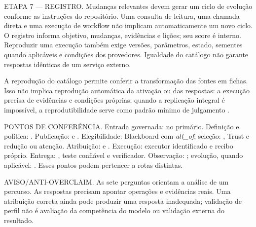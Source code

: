 \begin{processo}
ETAPA 7 — REGISTRO. Mudanças relevantes devem gerar um ciclo de evolução
conforme as instruções do repositório. Uma consulta de leitura, uma chamada
direta e uma execução de workflow não implicam automaticamente um novo ciclo.
O registro informa objetivo, mudanças, evidências e lições; seu score é interno.
Reproduzir uma execução também exige versões, parâmetros, estado, sementes
quando aplicáveis e condições dos provedores. Igualdade do catálogo não garante
respostas idênticas de um serviço externo.
\end{processo}

A reprodução do catálogo permite conferir a transformação das fontes em fichas.
Isso não implica reprodução automática da ativação ou das respostas: a execução
precisa de evidências e condições próprias; quando a replicação integral é
impossível, a reprodutibilidade serve como padrão mínimo de julgamento .\begin{arquitetura}
PONTOS DE CONFERÊNCIA. Entrada governada:  no
primário. Definição e política: . Publicação:
 e . Elegibilidade: Blackboard com \emph{all\_of};
seleção: , Trust e redução ou atenção. Atribuição:
 e . Execução: executor identificado e
recibo próprio. Entrega: , teste confiável e verificador.
Observação: ; evolução, quando aplicável:
. Esses pontos podem pertencer a rotas distintas.
\end{arquitetura}

\begin{aviso}
AVISO/ANTI-OVERCLAIM. As sete perguntas orientam a análise de um percurso.
As respostas precisam apontar operações e evidências reais. Uma atribuição
correta ainda pode produzir uma resposta inadequada; validação de perfil não
é avaliação da competência do modelo ou validação externa do resultado.
\end{aviso}

